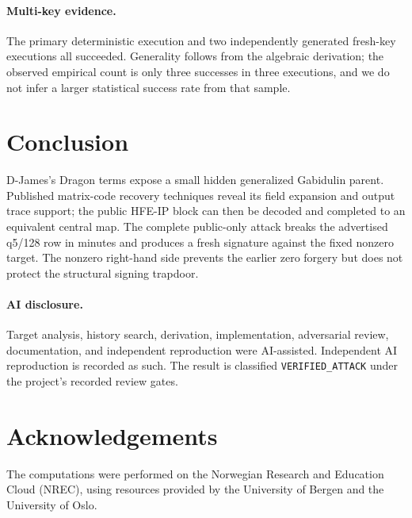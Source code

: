 \documentclass[10pt,a4paper]{article}
\begin{document}
\paragraph{Multi-key evidence.}
The primary deterministic execution and two independently generated fresh-key
executions all succeeded.  Generality follows from the algebraic derivation;
the observed empirical count is only three successes in three executions, and
we do not infer a larger statistical success rate from that sample.

\section{Conclusion}

D-James's Dragon terms expose a small hidden generalized Gabidulin parent.
Published matrix-code recovery techniques reveal its field expansion and
output trace support; the public HFE-IP block can then be decoded and completed
to an equivalent central map.  The complete public-only attack breaks the
advertised q5/128 row in minutes and produces a fresh signature against the
fixed nonzero target.  The nonzero right-hand side prevents the earlier zero
forgery but does not protect the structural signing trapdoor.

\paragraph{AI disclosure.}
Target analysis, history search, derivation, implementation, adversarial
review, documentation, and independent reproduction were AI-assisted.
Independent AI reproduction is recorded as such. The result is classified
\texttt{VERIFIED\_ATTACK} under the project's recorded review gates.

\section*{Acknowledgements}

The computations were performed on the Norwegian Research and Education Cloud (NREC), using resources provided by the University of Bergen and the University of Oslo.
\end{document}
